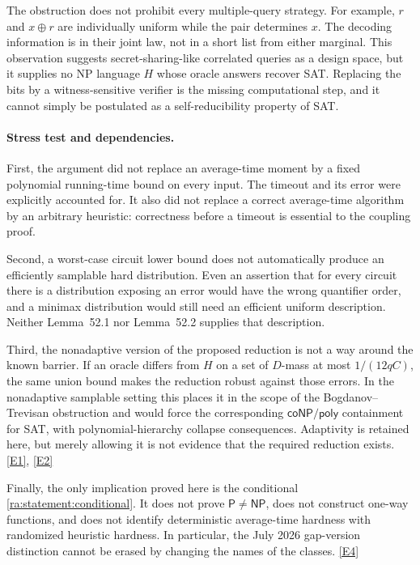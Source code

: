 \documentclass[11pt]{article}
\newcommand{\eref}[2]{\hyperlink{extra:#1:#2}{[E#2]}}
\begin{document}
The obstruction does not prohibit every multiple-query strategy. For
example, $r$ and $x\mathbin{\oplus}r$ are individually uniform while the
pair determines $x$. The decoding information is in their joint law,
not in a short list from either marginal. This observation suggests
secret-sharing-like correlated queries as a design space, but it supplies
no NP language $H$ whose oracle answers recover SAT. Replacing the bits
by a witness-sensitive verifier is the missing computational step, and
it cannot simply be postulated as a self-reducibility property of SAT.

\paragraph{Stress test and dependencies.}
First, the argument did not replace an average-time moment by a fixed
polynomial running-time bound on every input. The timeout and its error
were explicitly accounted for. It also did not replace a correct
average-time algorithm by an arbitrary heuristic: correctness before a
timeout is essential to the coupling proof.

Second, a worst-case circuit lower bound does not automatically produce
an efficiently samplable hard distribution. Even an assertion that for
every circuit there is a distribution exposing an error would have the
wrong quantifier order, and a minimax distribution would still need an
efficient uniform description. Neither Lemma~52.1 nor Lemma~52.2 supplies
that description.

Third, the nonadaptive version of the proposed reduction is not a way
around the known barrier. If an oracle differs from $H$ on a set of
$D$-mass at most $1/(12qC)$, the same union bound makes the reduction
robust against those errors. In the nonadaptive samplable setting this
places it in the scope of the Bogdanov--Trevisan obstruction and would
force the corresponding $\mathsf{coNP/poly}$ containment for SAT, with
polynomial-hierarchy collapse consequences. Adaptivity is retained here,
but merely allowing it is not evidence that the required reduction exists.
\eref{statement}{1}, \eref{statement}{2}

Finally, the only implication proved here is the conditional
\eqref{ra:statement:conditional}. It does not prove $\mathsf P\ne\mathsf{NP}$,
does not construct one-way functions, and does not identify deterministic
average-time hardness with randomized heuristic hardness. In particular,
the July 2026 gap-version distinction cannot be erased by changing the
names of the classes. \eref{statement}{4}
\end{document}
